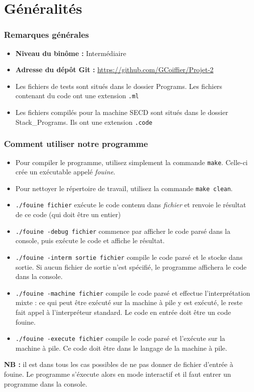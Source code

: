 \part{Généralités}

\section*{Remarques générales}

\begin{itemize}
 \setlength\itemsep{3pt}
 \item \textbf{Niveau du binôme :} Intermédiaire
 \item \textbf{Adresse du dépôt Git :} \url{https://github.com/GCoiffier/Projet-2}
 \item Les fichiers de tests sont situés dans le dossier Programs. Les fichiers contenant du code \fouine ont une extension \texttt{.ml}
 \item Les fichiers compilés pour la machine SECD sont situés dans le dossier Stack\_Programs. Ils ont une extension \texttt{.code}
 \end{itemize}

\section{Comment utiliser notre programme}

\begin{itemize}
  \setlength\itemsep{3pt}
 \item Pour compiler le programme, utilisez simplement la commande \texttt{make}. Celle-ci crée un exécutable appelé \textit{fouine}.
 \item Pour nettoyer le répertoire de travail, utilisez la commande \texttt{make clean}.
 \item \texttt{./fouine fichier} exécute le code contenu dans \textit{fichier} et renvoie le résultat de ce code (qui doit être un entier)
 \item \texttt{./fouine -debug fichier} commence par afficher le code parsé dans la console, puis exécute le code et affiche le résultat.
 \item \texttt{./fouine -interm sortie fichier} compile le code parsé et le stocke dans sortie. Si aucun fichier de sortie n'est spécifié, le programme affichera le code dans la console.
 \item \texttt{./fouine -machine fichier} compile le code parsé et effectue l'interprétation mixte : ce qui peut être exécuté sur la machine à pile y est exécuté, le reste fait appel à l'interpréteur standard. Le code en entrée doit être un code fouine.
 \item \texttt{./fouine -execute fichier} compile le code parsé et l'exécute sur la machine à pile. Ce code doit être dans le langage de la machine à pile.
\end{itemize}
\textbf{NB :} il est dans tous les cas possibles de ne pas donner de fichier d'entrée à fouine. Le programme s'éxecute alors en mode interactif et il faut entrer un programme dans la console.

